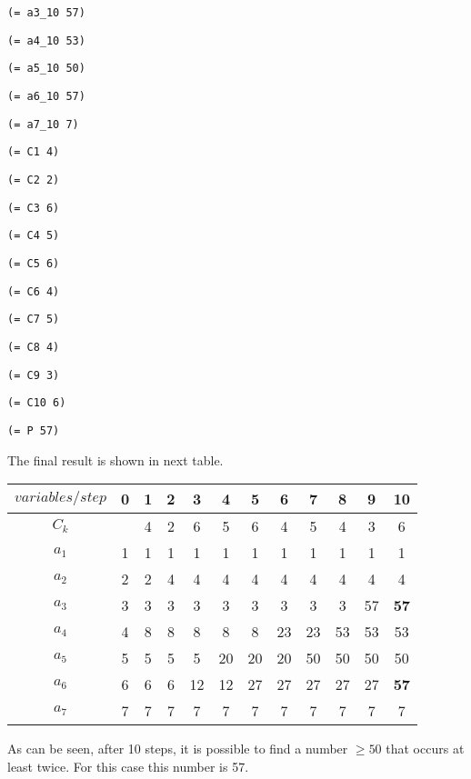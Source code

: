 {{\tt (= a3\_10 57)}

{\tt (= a4\_10 53)}

{\tt (= a5\_10 50)}

{\tt (= a6\_10 57)}

{\tt (= a7\_10 7)}

{\tt (= C1 4)}

{\tt (= C2 2)}

{\tt (= C3 6)}

{\tt (= C4 5)}

{\tt (= C5 6)}

{\tt (= C6 4)}

{\tt (= C7 5)}

{\tt (= C8 4)}

{\tt (= C9 3)}

{\tt (= C10 6)}

{\tt (= P 57)}

\vspace{3mm}

The final result is shown in next table.

\begin{center}
\begin{tabular}{|c|c|c|c|c|c|c|c|c|c|c|c|}
  \hline
  $variables/step$ & 0 & 1 & 2 & 3 & 4 & 5 & 6 & 7 & 8 & 9 & 10 \\
  \hline
  $C_{k}$ &   & 4 & 2 & 6 & 5 & 6   & 4  & 5  & 4 & 3 & 6 \\
  $a_{1}$ & 1 & 1 & 1 & 1 & 1 & 1   & 1  & 1  & 1 & 1 & 1 \\
  $a_{2}$ & 2 & 2 & 4 & 4 & 4 & 4   & 4  & 4  & 4 & 4 & 4 \\
  $a_{3}$ & 3 & 3 & 3 & 3 & 3 & 3   & 3  & 3  & 3 & 57 & \textbf{57} \\
  $a_{4}$ & 4 & 8 & 8 & 8 & 8 & 8   & 23 & 23 & 53 & 53 & 53 \\
  $a_{5}$ & 5 & 5 & 5 & 5 & 20 & 20 & 20 & 50 & 50 & 50 & 50 \\
  $a_{6}$ & 6 & 6 & 6 & 12 & 12 & 27 & 27 & 27 & 27 & 27 & \textbf{57} \\
  $a_{7}$ & 7 & 7 & 7 & 7 & 7 & 7 & 7 & 7 & 7 & 7 & 7 \\
  \hline
\end{tabular}
\end{center}

As can be seen, after 10 steps, it is possible to find a number $\geq 50$ that occurs at least twice. For this case this number is 57.

\vspace{3mm}

}
